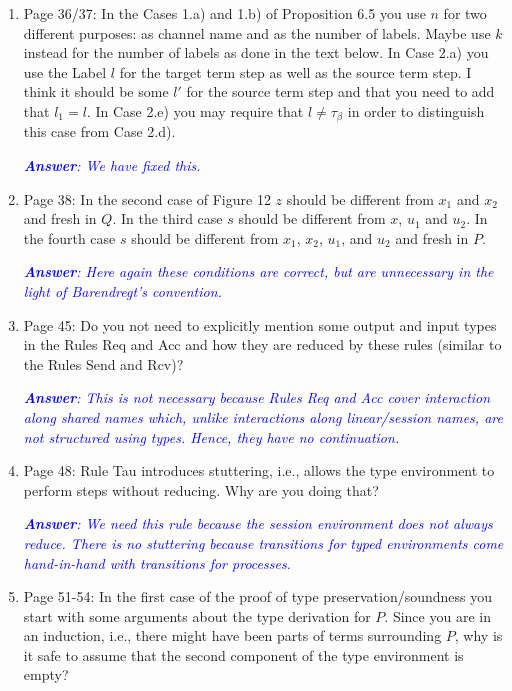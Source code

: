\documentclass[11pt,a4paper]{article}
\newcommand{\answ}[1]{\smallskip \emph{\textcolor{blue}{\textbf{Answer}:  #1}}}
\begin{document}
\begin{enumerate}
  \answ{We didn't use tuples because we would need tuples of different lengths. We have revised the definition so as to have sequences of actions, rather than unordered sets. }
  
\item  Page 36/37: In the Cases 1.a) and 1.b) of Proposition 6.5 you use $n$ for two
  different purposes: as channel name and as the number of labels. Maybe use $k$
  instead for the number of labels as done in the text below.
  In Case 2.a) you use the Label $l$ for the target term step as well as the
  source term step. I think it should be some $l'$ for the source term step and
  that you need to add that $l_1 = l$.
  In Case 2.e) you may require that $l \neq \tau_\beta$ in order to distinguish
  this case from Case 2.d).
  
    \answ{We have fixed this.}
    
  
\item  Page 38: In the second case of Figure 12 $z$ should be different from $x_1$ and
  $x_2$ and fresh in $Q$. 
  In the third case $s$ should be different from $x$, $u_1$ and $u_2$. 
  In the fourth case $s$ should be different from $x_1$, $x_2$, $u_1$, and $u_2$ and
  fresh in $P$.
  
   \answ{Here again these conditions are correct, but are unnecessary in the light of Barendregt's convention.}
  
  
\item Page 45: Do you not need to explicitly mention some output and input types in
  the Rules Req and Acc and how they are reduced by these rules (similar to the
  Rules Send and Rcv)?
  
  \answ{This is not necessary because Rules Req and Acc cover interaction along shared names which, unlike interactions along linear/session names, are not structured using types. Hence, they have no continuation.}
  
\item  Page 48: Rule Tau introduces stuttering, i.e., allows the type environment to
  perform steps without reducing. Why are you doing that?
  
  \answ{We need this rule because the session environment does not always reduce.
  There is no stuttering because transitions for typed environments come hand-in-hand with
  transitions for processes.}
  
  
\item  Page 51-54: In the first case of the proof of type preservation/soundness you
  start with some arguments about the type derivation for $P$. Since you are in an
  induction, i.e., there might have been parts of terms surrounding $P$, why is it
  safe to assume that the second component of the type environment is empty?
  

\end{enumerate}
\end{document}
